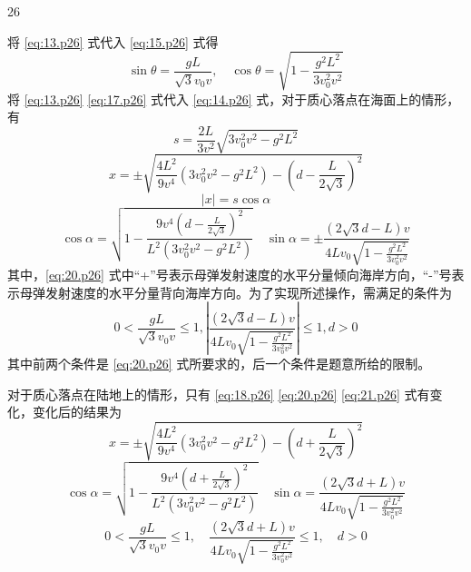 \begin{solution}{26}
\begin{subproblem}[参考解答（二）]
    将 \eqref{eq:13.p26} 式代入 \eqref{eq:15.p26} 式得
    \begin{equation}
      \sin \theta = \frac{g L}{\sqrt{3} v_{0} v}, \quad \cos \theta = \sqrt{1 - \frac{g^{2} L^{2}}{3 v_{0}^{2} v^{2}}}
      \label{eq:17.p26}
    \end{equation}
    将 \eqref{eq:13.p26} \eqref{eq:17.p26} 式代入 \eqref{eq:14.p26} 式，对于质心落点在海面上的情形，有
    \begin{equation}
      s = \frac{2 L}{3 v^{2}} \sqrt{3 v_{0}^{2} v^{2} - g^{2} L^{2}}
    \end{equation}
    \begin{equation}
      x = \pm \sqrt{\frac{4 L^{2}}{9 v^{4}} (3 v_{0}^{2} v^{2} - g^{2} L^{2}) - (d - \frac{L}{2 \sqrt{3}})^{2}}
      \label{eq:18.p26}
    \end{equation}
    \begin{equation}
      |x| = s \cos \alpha
      \label{eq:19.p26}
    \end{equation}
    \begin{equation}
      \cos \alpha = \sqrt{1 - \frac{9 v^{4} \left(d - \frac{L}{2 \sqrt{3}}\right)^{2}}{L^{2} (3 v_{0}^{2} v^{2} - g^{2} L^{2})}} \quad \sin \alpha = \pm \frac{(2 \sqrt{3} d - L) v}{4 L v_{0} \sqrt{1 - \frac{g^{2} L^{2}}{3 v_{0}^{2} v^{2}}}}
      \label{eq:20.p26}
    \end{equation}
    其中，\eqref{eq:20.p26} 式中“+”号表示母弹发射速度的水平分量倾向海岸方向，“-”号表示母弹发射速度的水平分量背向海岸方向。为了实现所述操作，需满足的条件为
    \begin{equation}
      0 < \frac{g L}{\sqrt{3} v_{0} v} \leq 1, \left| \frac{(2 \sqrt{3} d - L) v}{4 L v_{0} \sqrt{1 - \frac{g^{2} L^{2}}{3 v_{0}^{2} v^{2}}}} \right| \leq 1, d > 0
      \label{eq:21.p26}
    \end{equation}
    其中前两个条件是 \eqref{eq:20.p26} 式所要求的，后一个条件是题意所给的限制。

    对于质心落点在陆地上的情形，只有 \eqref{eq:18.p26} \eqref{eq:20.p26} \eqref{eq:21.p26} 式有变化，变化后的结果为
    \begin{equation}
      x = \pm \sqrt{\frac{4 L^{2}}{9 v^{4}} (3 v_{0}^{2} v^{2} - g^{2} L^{2}) - (d + \frac{L}{2 \sqrt{3}})^{2}}
      \label{eq:22.p26}
    \end{equation}
    \begin{equation}
      \cos \alpha = \sqrt{1 - \frac{9 v^{4} \left(d + \frac{L}{2 \sqrt{3}}\right)^{2}}{L^{2} (3 v_{0}^{2} v^{2} - g^{2} L^{2})}} \quad \sin \alpha = \frac{(2 \sqrt{3} d + L) v}{4 L v_{0} \sqrt{1 - \frac{g^{2} L^{2}}{3 v_{0}^{2} v^{2}}}}
      \label{eq:23.p26}
    \end{equation}
    \begin{equation}
      0 < \frac{g L}{\sqrt{3} v_{0} v} \leq 1, \quad \frac{(2 \sqrt{3} d + L) v}{4 L v_{0} \sqrt{1 - \frac{g^{2} L^{2}}{3 v_{0}^{2} v^{2}}}} \leq 1, \quad d > 0
      \label{eq:24.p26}
    \end{equation}
  \end{subproblem}
\end{solution}
